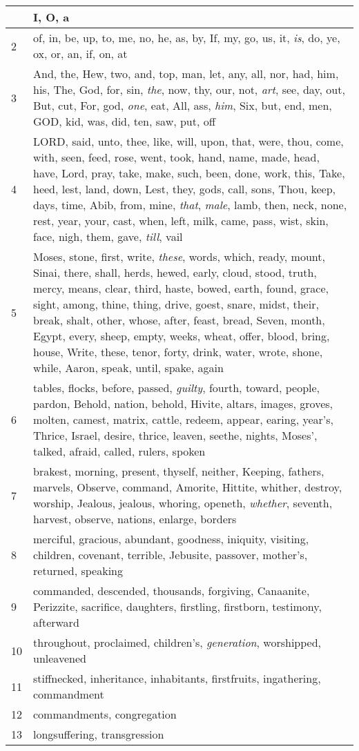 \begin{longtable}{l|p{3.75in}}
\hline \hline
\endlastfoot
1 & I, O, a \\ \hline
2 & of, in, be, up, to, me, no, he, as, by, If, my, go, us, it, \emph{is}, do, ye, ox, or, an, if, on, at \\ \hline
3 & And, the, Hew, two, and, top, man, let, any, all, nor, had, him, his, The, God, for, sin, \emph{the}, now, thy, our, not, \emph{art}, see, day, out, But, cut, For, god, \emph{one}, eat, All, ass, \emph{him}, Six, but, end, men, GOD, kid, was, did, ten, saw, put, off \\ \hline
4 & LORD, said, unto, thee, like, will, upon, that, were, thou, come, with, seen, feed, rose, went, took, hand, name, made, head, have, Lord, pray, take, make, such, been, done, work, this, Take, heed, lest, land, down, Lest, they, gods, call, sons, Thou, keep, days, time, Abib, from, mine, \emph{that}, \emph{male}, lamb, then, neck, none, rest, year, your, cast, when, left, milk, came, pass, wist, skin, face, nigh, them, gave, \emph{till}, vail \\ \hline
5 & Moses, stone, first, write, \emph{these}, words, which, ready, mount, Sinai, there, shall, herds, hewed, early, cloud, stood, truth, mercy, means, clear, third, haste, bowed, earth, found, grace, sight, among, thine, thing, drive, goest, snare, midst, their, break, shalt, other, whose, after, feast, bread, Seven, month, Egypt, every, sheep, empty, weeks, wheat, offer, blood, bring, house, Write, these, tenor, forty, drink, water, wrote, shone, while, Aaron, speak, until, spake, again \\ \hline
6 & tables, flocks, before, passed, \emph{guilty}, fourth, toward, people, pardon, Behold, nation, behold, Hivite, altars, images, groves, molten, camest, matrix, cattle, redeem, appear, earing, year's, Thrice, Israel, desire, thrice, leaven, seethe, nights, Moses', talked, afraid, called, rulers, spoken \\ \hline
7 & brakest, morning, present, thyself, neither, Keeping, fathers, marvels, Observe, command, Amorite, Hittite, whither, destroy, worship, Jealous, jealous, whoring, openeth, \emph{whether}, seventh, harvest, observe, nations, enlarge, borders \\ \hline
8 & merciful, gracious, abundant, goodness, iniquity, visiting, children, covenant, terrible, Jebusite, passover, mother's, returned, speaking \\ \hline
9 & commanded, descended, thousands, forgiving, Canaanite, Perizzite, sacrifice, daughters, firstling, firstborn, testimony, afterward \\ \hline
10 & throughout, proclaimed, children's, \emph{generation}, worshipped, unleavened \\ \hline
11 & stiffnecked, inheritance, inhabitants, firstfruits, ingathering, commandment \\ \hline
12 & commandments, congregation \\ \hline
13 & longsuffering, transgression \\ \hline
\end{longtable}






